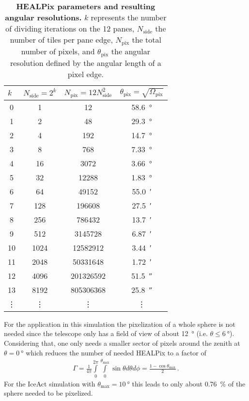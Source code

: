 \begin{table}[h]
\centering
\begin{tabular}{S[table-format=2.0]|S[table-format=4.0]|S[table-format=9.0]|S[table-format=2.2]}
 &  &  &  \\
  & 1    & 12        &  \SI{58.6}{\degree}\\
1  & 2    & 48        &  \SI{29.3}{\degree}\\
2  & 4    & 192       &  \SI{14.7}{\degree}\\
3  & 8    & 768 	  &  \SI{7.33}{\degree}\\
4  & 16   & 3072      &  \SI{3.66}{\degree}\\
5  & 32   & 12288     &  \SI{1.83}{\degree}\\
6  & 64   & 49152     &  \SI{55.0}{\arcminute}\\
7  & 128  & 196608    &  \SI{27.5}{\arcminute}\\
8  & 256  & 786432    &  \SI{13.7}{\arcminute}\\
9  & 512  & 3145728   &  \SI{6.87}{\arcminute}\\
10 & 1024 & 12582912  &  \SI{3.44}{\arcminute}\\
11 & 2048 & 50331648  &  \SI{1.72}{\arcminute}\\
12 & 4096 & 201326592 &  \SI{51.5}{\arcsecond}\\
13 & 8192 & 805306368 &  \SI{25.8}{\arcsecond}\\
 &  &  &  \\
\end{tabular}
\caption[HEALPix parameters and resulting angular resolutions]{\textbf{HEALPix parameters and resulting angular resolutions.} $k$ represents the number of dividing iterations on the 12 panes, $N_\text{side}$ the number of tiles per pane edge, $N_\text{pix}$ the total number of pixels, and $\theta_\text{pix}$ the angular resolution defined by the angular length of a pixel edge. \cite{healpix:paper}}
\end{table}

For the application in this simulation the pixelization of a whole sphere is not needed since the telescope only has a field of view of about \SI{12}{\degree} (i.e. $\theta \leq \SI{6}{\degree}$). Considering that, one only needs a smaller sector of pixels around the zenith at $\theta = \SI{0}{\degree}$ which reduces the number of needed HEALPix to a factor of
\begin{align}
	\Gamma = \frac{1}{4\pi}\int\limits_{0}^{2\pi}\int\limits_{0}^{\theta_\text{max}}\sin{\theta} d\theta d\phi = \frac{1-\cos\theta_\text{max}}{2}\,.
	\label{eq:spherefactor}
\end{align}
For the IceAct simulation with $\theta_\text{max} = \SI{10}{\degree}$ this leads to only about \SI{0.76}{\percent} of the sphere needed to be pixelized.

